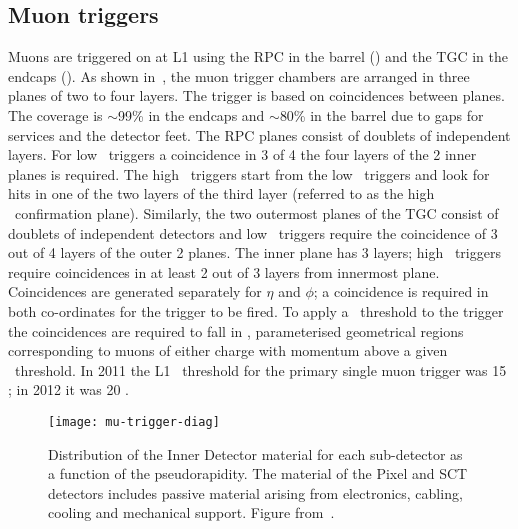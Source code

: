 \subsection{Muon triggers}
\label{sec:reco-mu-triggers}

Muons are triggered on at L1 using the RPC in the barrel () and
the TGC in the endcaps (). As shown in~, the
muon trigger chambers are arranged in three planes of two to four layers. The
trigger is based on coincidences between planes. 
The coverage is $\sim$99\% in the endcaps and $\sim$80\% in the barrel due to
gaps for services and the detector feet.
The RPC planes consist of
doublets of independent layers. For low \pt\ triggers a coincidence in 3 of 4
the four layers of the 2 inner planes is required. The high \pt\ triggers start
from the low \pt\ triggers and look for hits in one of the two layers of the
third layer (referred to as the high \pt\ confirmation plane). Similarly, the two outermost
planes of the TGC consist of doublets of independent detectors and low \pt\
triggers require the coincidence of 3 out of 4 layers of the outer 2 planes. The
inner plane has 3 layers; high \pt\ triggers require coincidences in at least 2
out of 3 layers from innermost plane. Coincidences are generated separately for
$\eta$ and $\phi$; a coincidence is required in both co-ordinates for the
trigger to be fired. To apply a \pt\ threshold to the trigger the coincidences
are required to fall in \intro{roads}, parameterised geometrical regions
corresponding to muons of either charge with momentum above a given \pt\
threshold. In 2011 the L1 \pt\ threshold for the primary single muon trigger was
15 \GeV; in 2012 it was 20 \GeV.

\begin{figure}[h]
\centering
            \texttt{[image: mu-trigger-diag]}
\caption{
Distribution of the Inner Detector material for each sub-detector as a
function of the pseudorapidity. The material of the Pixel and SCT detectors
includes passive material arising from electronics, cabling, cooling and
mechanical support. Figure from~\cite{TriggerPerf2010}.}
\label{fig:mu-trigger-diag}
\end{figure}

